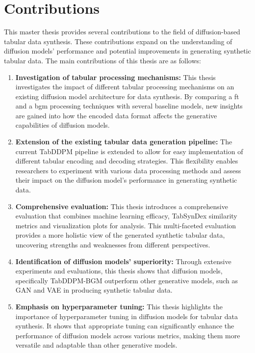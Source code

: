 \section{Contributions}
\label{ch:intro-contributions}
This master thesis provides several contributions to the field of diffusion-based tabular data synthesis.
These contributions expand on the understanding of diffusion models' performance and potential improvements in generating synthetic tabular data.
The main contributions of this thesis are as follows:
\begin{enumerate}
	\item \textbf{Investigation of tabular processing mechanisms:}
	      This thesis investigates the impact of different tabular processing mechanisms on an existing diffusion model architecture for data synthesis.
	      By comparing a \gls{ft} and a \gls{bgm} processing techniques with several baseline models, new insights are gained into how the encoded data format affects the generative capabilities of diffusion models.
	\item \textbf{Extension of the existing tabular data generation pipeline:}
	      The current TabDDPM \cite{kotelnikov2022TabDDPMModellingTabular} pipeline is extended to allow for easy implementation of different tabular encoding and decoding strategies.
	      This flexibility enables researchers to experiment with various data processing methods and assess their impact on the diffusion model's performance in generating synthetic data.
	\item \textbf{Comprehensive evaluation:}
	      This thesis introduces a comprehensive evaluation that combines machine learning efficacy,
	      TabSynDex similarity metrics and visualization plots for analysis.
	      This multi-faceted evaluation provides a more holistic view of the generated synthetic tabular data,
	      uncovering strengths and weaknesses from different perspectives.
	\item \textbf{Identification of diffusion models' superiority:}
	      Through extensive experiments and evaluations, this thesis shows that diffusion models, specifically TabDDPM-BGM outperform other generative models, such as GAN and VAE in producing synthetic tabular data.
	\item \textbf{Emphasis on hyperparameter tuning:}
	      This thesis highlights the importance of hyperparameter tuning in diffusion models for tabular data synthesis.
	      It shows that appropriate tuning can significantly enhance the performance of diffusion models across various metrics,
	      making them more versatile and adaptable than other generative models.
\end{enumerate}

